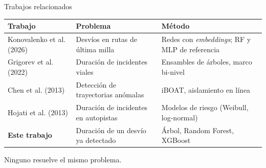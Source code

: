 \documentclass[aspectratio=169,10pt]{beamer}
\begin{document}
\begin{frame}{Trabajos relacionados}
  \begingroup\footnotesize
  \renewcommand{\arraystretch}{1.25}
  \begin{tabularx}{\textwidth}{@{}L{3.2cm}YY@{}}
    \toprule
    \textbf{Trabajo} & \textbf{Problema} & \textbf{Método} \\
    \midrule
    Konovalenko et al. (2026) & Desvíos en rutas de última milla & Redes con \emph{embeddings}; RF y MLP de referencia \\
    Grigorev et al. (2022) & Duración de incidentes viales & Ensambles de árboles, marco bi-nivel \\
    Chen et al. (2013) & Detección de trayectorias anómalas & iBOAT, aislamiento en línea \\
    Hojati et al. (2013) & Duración de incidentes en autopistas & Modelos de riesgo (Weibull, log-normal) \\
    \midrule
    \textbf{Este trabajo} & Duración de un desvío ya detectado & Árbol, Random Forest, XGBoost \\
    \bottomrule
  \end{tabularx}\endgroup
  \vspace{0.25cm}

  {\footnotesize\color{gris}Ninguno resuelve el mismo problema.}
\end{frame}

\end{document}
